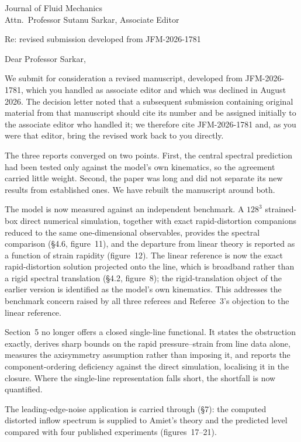 \documentclass[11pt]{article}
\begin{document}
\thispagestyle{empty}

\noindent Journal of Fluid Mechanics\\
\noindent Attn.\ Professor Sutanu Sarkar, Associate Editor

\bigskip
\noindent Re: revised submission developed from JFM-2026-1781

\bigskip
\noindent Dear Professor Sarkar,

We submit for consideration a revised manuscript, developed from JFM-2026-1781,
which you handled as associate editor and which was declined in August 2026. The
decision letter noted that a subsequent submission containing original material
from that manuscript should cite its number and be assigned initially to the
associate editor who handled it; we therefore cite JFM-2026-1781 and, as you were
that editor, bring the revised work back to you directly.

The three reports converged on two points. First, the central spectral prediction
had been tested only against the model's own kinematics, so the agreement carried
little weight. Second, the paper was long and did not separate its new results from
established ones. We have rebuilt the manuscript around both.

The model is now measured against an independent benchmark. A $128^3$ strained-box
direct numerical simulation, together with exact rapid-distortion companions reduced
to the same one-dimensional observables, provides the spectral comparison
(\S4.6, figure~11), and the departure from linear theory is reported as a function
of strain rapidity (figure~12). The linear reference is now the exact
rapid-distortion solution projected onto the line, which is broadband rather than a
rigid spectral translation (\S4.2, figure~8); the rigid-translation object of the
earlier version is identified as the model's own kinematics. This addresses the
benchmark concern raised by all three referees and Referee~3's objection to the
linear reference.

Section~5 no longer offers a closed single-line functional. It states the
obstruction exactly, derives sharp bounds on the rapid pressure--strain from line
data alone, measures the axisymmetry assumption rather than imposing it, and reports
the component-ordering deficiency against the direct simulation, localising it in the
closure. Where the single-line representation falls short, the shortfall is now
quantified.

The leading-edge-noise application is carried through (\S7): the computed distorted
inflow spectrum is supplied to Amiet's theory and the predicted level compared with
four published experiments (figures~17--21).
\end{document}
